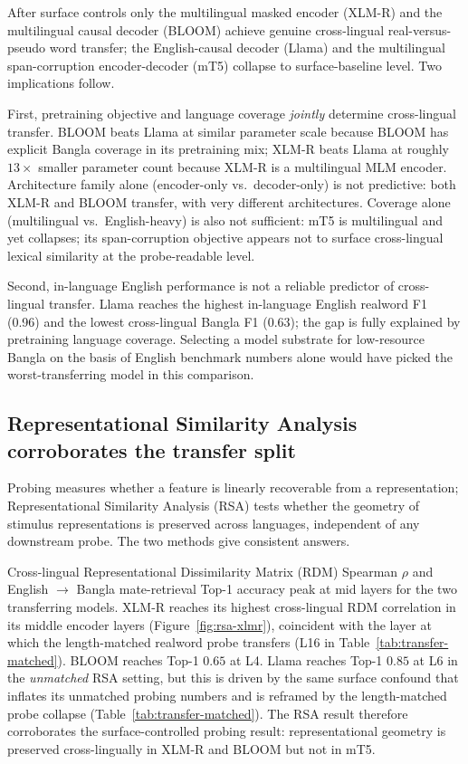 After surface controls only the multilingual masked encoder (XLM-R) and the multilingual causal decoder (BLOOM) achieve genuine cross-lingual real-versus-pseudo word transfer; the English-causal decoder (Llama) and the multilingual span-corruption encoder-decoder (mT5) collapse to surface-baseline level. Two implications follow.

First, pretraining objective and language coverage \emph{jointly} determine cross-lingual transfer. BLOOM beats Llama at similar parameter scale because BLOOM has explicit Bangla coverage in its pretraining mix; XLM-R beats Llama at roughly $13\times$ smaller parameter count because XLM-R is a multilingual MLM encoder. Architecture family alone (encoder-only vs.\ decoder-only) is not predictive: both XLM-R and BLOOM transfer, with very different architectures. Coverage alone (multilingual vs.\ English-heavy) is also not sufficient: mT5 is multilingual and yet collapses; its span-corruption objective appears not to surface cross-lingual lexical similarity at the probe-readable level.

Second, in-language English performance is not a reliable predictor of cross-lingual transfer. Llama reaches the highest in-language English realword F1 (0.96) and the lowest cross-lingual Bangla F1 (0.63); the gap is fully explained by pretraining language coverage. Selecting a model substrate for low-resource Bangla on the basis of English benchmark numbers alone would have picked the worst-transferring model in this comparison.

\subsection{Representational Similarity Analysis corroborates the transfer split}
\label{sec:rsa}

Probing measures whether a feature is linearly recoverable from a representation; Representational Similarity Analysis (RSA) tests whether the geometry of stimulus representations is preserved across languages, independent of any downstream probe. The two methods give consistent answers.

Cross-lingual Representational Dissimilarity Matrix (RDM) Spearman $\rho$ and English $\rightarrow$ Bangla mate-retrieval Top-1 accuracy peak at mid layers for the two transferring models. XLM-R reaches its highest cross-lingual RDM correlation in its middle encoder layers (Figure~\ref{fig:rsa-xlmr}), coincident with the layer at which the length-matched realword probe transfers (L16 in Table~\ref{tab:transfer-matched}). BLOOM reaches Top-1 $0.65$ at L4. Llama reaches Top-1 $0.85$ at L6 in the \emph{unmatched} RSA setting, but this is driven by the same surface confound that inflates its unmatched probing numbers and is reframed by the length-matched probe collapse (Table~\ref{tab:transfer-matched}). The RSA result therefore corroborates the surface-controlled probing result: representational geometry is preserved cross-lingually in XLM-R and BLOOM but not in mT5.

